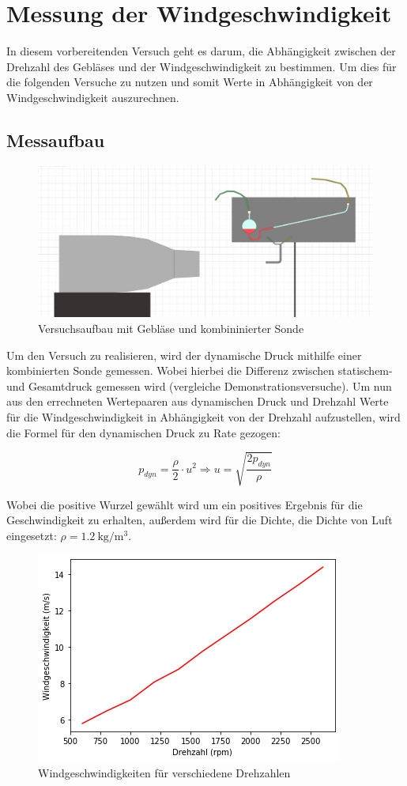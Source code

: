 \section{Messung der Windgeschwindigkeit}

In diesem vorbereitenden Versuch geht es darum, die Abhängigkeit zwischen der Drehzahl des Gebläses und der Windgeschwindigkeit zu bestimmen. Um dies für die folgenden Versuche zu nutzen und somit Werte in Abhängigkeit von der Windgeschwindigkeit auszurechnen.

\subsection{Messaufbau}

\begin{figure}[h!]
    \centering
    \includegraphics[scale=0.8]{Aeromechanik/Protokoll/fig/Kombi_Sonde.png}
    \caption{Versuchsaufbau mit Gebläse und kombininierter Sonde}
    \label{fig:Aeromechanik Versuch 1.2}
\end{figure}


Um den Versuch zu realisieren, wird der dynamische Druck mithilfe einer kombinierten Sonde gemessen. Wobei hierbei die Differenz zwischen statischem- und Gesamtdruck gemessen wird (vergleiche Demonstrationsversuche). Um nun aus den errechneten Wertepaaren aus dynamischen Druck und Drehzahl Werte für die Windgeschwindigkeit in Abhängigkeit von der Drehzahl aufzustellen, wird die Formel für den dynamischen Druck zu Rate gezogen: 

\begin{equation}
    p_{dyn} = \frac{\rho}{2} \cdot u^2
    \Rightarrow u = \sqrt{\frac{2p_{dyn}}{\rho}}
\end{equation}

Wobei die positive Wurzel gewählt wird um ein positives Ergebnis für die Geschwindigkeit zu erhalten, außerdem wird für die Dichte, die Dichte von Luft eingesetzt: $\rho = \SI{1.2}{\kg\per\cubic\m}$.

\begin{figure}[h!]
    \centering
    \includegraphics[scale=0.8]{Aeromechanik/Protokoll/fig/Aeromechanik Versuch 1.2.png}
    \caption{Windgeschwindigkeiten für verschiedene Drehzahlen}
    \label{fig:Aeromechanik Versuch 1.2}
\end{figure}